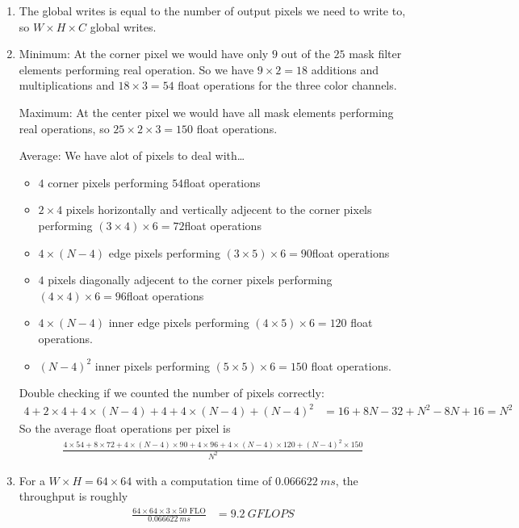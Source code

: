 \documentclass[../main.tex]{subfiles}
\begin{document}
\begin{enumerate}
    \item The global writes is equal to the number of output pixels we need to write to, so
    $W \times H \times C$ global writes.
    
    \item Minimum: At the corner pixel we would have only $9$ out of the $25$ mask filter elements performing
    real operation. So we have $9 \times 2= 18$ additions and multiplications and
    $18 \times 3 = 54$ float operations for the three color channels.

    Maximum: At the center pixel we would have all mask elements performing real operations, so
    $25 \times 2 \times 3 = 150$ float operations.

    Average: We have alot of pixels to deal with\dots
    \begin{itemize}
        \item $4$ corner pixels performing $54$float operations 
        \item $2 \times 4$ pixels horizontally and vertically adjecent to the corner pixels
        performing $(3 \times 4) \times 6 = 72$float operations 
        \item $4 \times (N - 4)$ edge pixels performing $(3 \times 5) \times 6 = 90$float operations 
        \item $4$ pixels diagonally adjecent to the corner pixels performing
        $(4 \times 4) \times 6 = 96$float operations 
        \item $4 \times (N - 4)$ inner edge pixels performing $(4 \times 5) \times 6 = 120$
        float operations.
        \item $(N - 4)^2$ inner pixels performing $(5 \times 5) \times 6 = 150$ float operations.
    \end{itemize}
    Double checking if we counted the number of pixels correctly:
    \begin{align*}
        4 + 2 \times 4 + 4 \times (N - 4) + 4 + 4 \times (N - 4) + (N - 4)^2 
        &= 16 + 8N - 32 + N^2 - 8N + 16 = N^2
    \end{align*}
    So the average float operations per pixel is
    \begin{align*}
        \frac{
            4 \times 54 + 8 \times 72 + 4 \times (N - 4) \times 90
                + 4 \times 96 + 4 \times (N - 4) \times 120 + (N - 4)^2 \times 150
        }{N^2}
    \end{align*}

    \item For a $W \times H = 64 \times 64$ with a computation time of $\qty{0.066622}{ms}$,
    the throughput is roughly
    \begin{align*}
        \frac{64 \times 64 \times 3 \times 50 \textrm{ FLO}}{\qty{0.066622}{ms}}
        &= \qty{9.2}{GFLOPS}
    \end{align*}


\end{enumerate}
\end{document}
